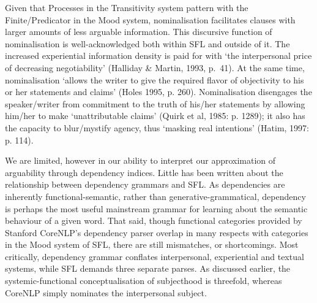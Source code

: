 Given that Processes in the Transitivity system pattern with the Finite\slash Predicator in the Mood system, nominalisation facilitates clauses with larger amounts of less arguable information. This discursive function of nominalisation is well-acknowledged both within SFL and outside of it. The increased experiential information density is paid for with `the interpersonal price of decreasing negotiability' (Halliday \& Martin, 1993, p.~41). At the same time, nominalisation `allows the writer to give the required flavor of objectivity to his or her statements and claims' (Holes 1995, p. 260). Nominalisation disengages the speaker\slash writer from commitment to the truth of his\slash her statements by allowing him\slash her to make `unattributable claims' (Quirk et al, 1985: p. 1289); it also has the capacity to blur\slash mystify agency, thus `masking real intentions' (Hatim, 1997: p. 114).






We are limited, however in our ability to interpret our approximation of arguability through dependency indices. Little has been written about the relationship between dependency grammars and SFL. As dependencies are inherently functional-semantic, rather than generative-grammatical, dependency is perhaps the most useful mainstream grammar for learning about the semantic behaviour of a given word. That said, though functional categories provided by Stanford CoreNLP's dependency parser overlap in many respects with categories in the Mood system of SFL, there are still mismatches, or shortcomings. Most critically, dependency grammar conflates interpersonal, experiential and textual systems, while SFL demands three separate parses. As discussed earlier, the systemic-functional conceptualisation of subjecthood is threefold, whereas CoreNLP simply nominates the interpersonal subject.

